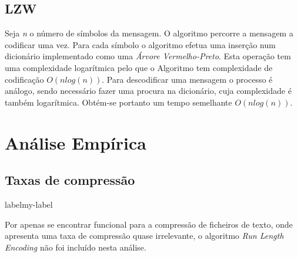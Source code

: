 \documentclass[a4paper,12pt,titlepage]{article}
\begin{document}
\subsection{LZW}
Seja \emph{n} o número de símbolos da mensagem.
O algoritmo percorre a mensagem a codificar uma vez. Para cada símbolo o algoritmo efetua uma inserção num dicionário implementado como uma \emph{Árvore Vermelho-Preto}. Esta operação tem uma complexidade logarítmica pelo que o Algoritmo tem complexidade de codificação $O(nlog(n))$. Para descodificar uma mensagem o processo é análogo, sendo necessário fazer uma procura na dicionário, cuja complexidade é também logarítmica. Obtém-se portanto um tempo semelhante $O(nlog(n))$.
\newpage
\section{Análise Empírica}
\subsection{Taxas de compressão}
\begin{table}[h]
\caption{Compressão obtida por cada algoritmo implementado sobre diferentes tipos de ficheiros}label{my-label}
\end{table}
Por apenas se encontrar funcional para a compressão de ficheiros de texto, onde apresenta uma taxa de compressão quase irrelevante, o algoritmo \emph{Run Length Encoding} não foi incluído nesta análise.
\end{document}
